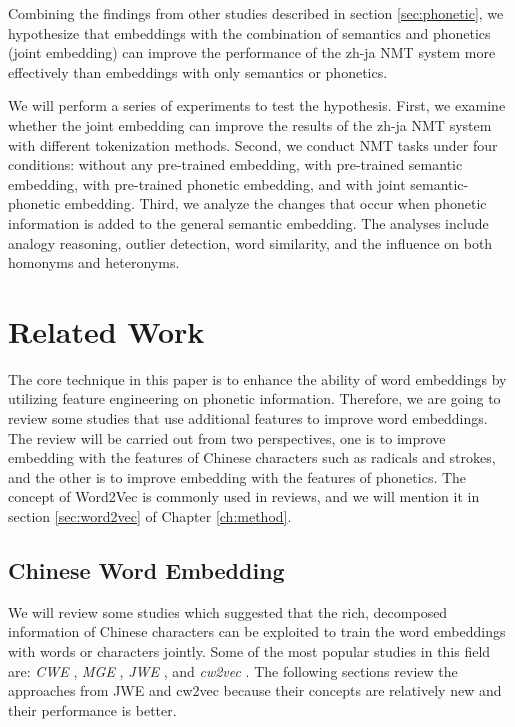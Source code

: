 Combining the findings from other studies \cite{liu-etal-2019-robust, khan2019diversity} described in section \ref{sec:phonetic}, we hypothesize that embeddings with the combination of semantics and phonetics (joint embedding) can improve the performance of the zh-ja NMT system more effectively than embeddings with only semantics or phonetics. 

We will perform a series of experiments to test the hypothesis. First, we examine whether the joint embedding can improve the results of the zh-ja NMT system with different tokenization methods. Second, we conduct NMT tasks under four conditions: without any pre-trained embedding, with pre-trained semantic embedding, with pre-trained phonetic embedding, and with joint semantic-phonetic embedding. Third, we analyze the changes that occur when phonetic information is added to the general semantic embedding. The analyses include analogy reasoning, outlier detection, word similarity, and the influence on both homonyms and heteronyms.

\section{Related Work} \label{sec:related_work}

The core technique in this paper is to enhance the ability of word embeddings by utilizing feature engineering on phonetic information. Therefore, we are going to review some studies that use additional features to improve word embeddings. The review will be carried out from two perspectives, one is to improve embedding with the features of Chinese characters such as radicals and strokes, and the other is to improve embedding with the features of phonetics. The concept of Word2Vec \cite{mikolov2013efficient} is commonly used in reviews, and we will mention it in section \ref{sec:word2vec} of Chapter \ref{ch:method}.

\subsection{Chinese Word Embedding} \label{sec:rw_cwe}

We will review some studies which suggested that the rich, decomposed information of Chinese characters can be exploited to train the word embeddings with words or characters jointly. Some of the most popular studies in this field are: \textit{CWE} \cite{chen2015joint}, \textit{MGE} \cite{yin2016multi}, \textit{JWE} \cite{yu2017joint}, and \textit{cw2vec} \cite{cao2018cw2vec}. The following sections review the approaches from JWE and cw2vec because their concepts are relatively new and their performance is better.

